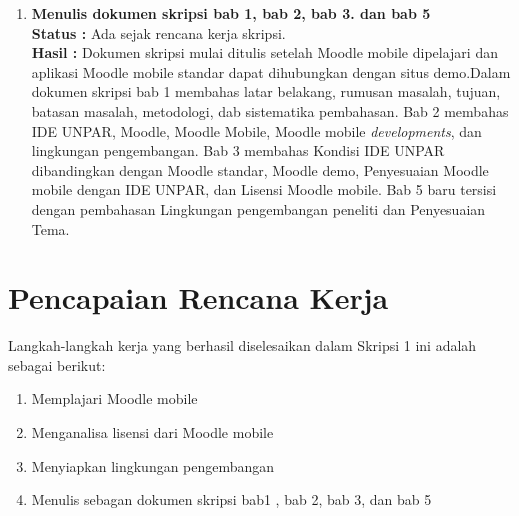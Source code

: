 \documentclass[a4paper,twoside]{article}
\begin{document}
\begin{enumerate}
\begin{enumerate}
\end{enumerate}

		
		\item \textbf{Menulis dokumen skripsi bab 1, bab 2, bab 3. dan bab 5}\\
		{\bf Status :} Ada sejak rencana kerja skripsi.\\
		{\bf Hasil :} Dokumen skripsi mulai ditulis setelah Moodle mobile dipelajari dan aplikasi Moodle mobile standar dapat dihubungkan dengan situs demo.Dalam dokumen skripsi bab 1 membahas latar belakang, rumusan masalah, tujuan, batasan masalah, metodologi, dab sistematika pembahasan. Bab 2 membahas IDE UNPAR, Moodle, Moodle Mobile,  Moodle mobile \textit{developments}, dan lingkungan pengembangan. Bab 3 membahas Kondisi IDE UNPAR dibandingkan dengan Moodle standar, Moodle demo, Penyesuaian Moodle mobile dengan IDE UNPAR, dan Lisensi Moodle mobile. Bab 5 baru tersisi dengan pembahasan Lingkungan pengembangan peneliti dan Penyesuaian Tema.
		

	\end{enumerate}

\section{Pencapaian Rencana Kerja}
Langkah-langkah kerja yang berhasil diselesaikan dalam Skripsi 1 ini adalah sebagai berikut:
\begin{enumerate}
\item Memplajari Moodle mobile
\item Menganalisa lisensi dari Moodle mobile
\item Menyiapkan lingkungan pengembangan
\item Menulis sebagan dokumen skripsi bab1 , bab 2,  bab 3, dan bab 5
\end{enumerate}
\end{document}
